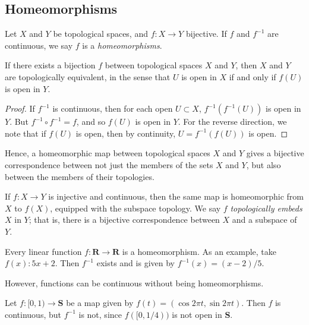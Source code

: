\subsection{Homeomorphisms}
\begin{definition}
\label{def:homeo}
Let \(X\) and \(Y\) be topological spaces, and  \(f: X \to Y\) bijective.
If \(f\) and \(f^{-1}\) are continuous, we say \(f\) is a
\emph{homeomorphisms}.
\end{definition}
\begin{theorem}
\label{thm:equiv-spaces}
If there exists a bijection \(f\) between topological spaces \(X\) and
\(Y\), then \(X\) and \(Y\) are topologically equivalent, in the sense that
\(U\) is open in \(X\) if and only if \(f(U)\) is open in \(Y\).
\end{theorem}
\begin{proof}
If \(f^{-1}\) is continuous, then for each open \(U \subset X\),
\(f^{-1}(f^{-1}(U))\) is open in \(Y\). But \(f^{-1} \circ f^{-1} = f\),
and so \(f(U)\) is open in \(Y\). For the reverse direction, we note that if
\(f(U)\) is open, then by continuity, \(U = f^{-1}(f(U)) \) is open.
\end{proof}
\begin{remark}
Hence, a homeomorphic map between topological spaces \(X\) and \(Y\) gives a
bijective correspondence between not just the members of the sets \(X\) and
\(Y\), but also between the members of their topologies.  \par If \(f: X \to
Y\) is injective and continuous, then the same map is homeomorphic from \(X\)
to \(f(X)\), equipped with the subspace topology. We say \(f\)
\emph{topologically embeds} \(X\) in \(Y\); that is, there is a bijective
correspondence between \(X\) and a subspace of \(Y\).
\end{remark}
\begin{example}
Every linear function \(f: \mathbf{R} \to \mathbf{R}\) is a homeomorphism. As
an example, take \(f(x): 5x + 2\). Then \(f^{-1}\) exists and is given by
\(f^{-1}(x) = (x-2)/5\).
\end{example}
However, functions can be continuous without being homeomorphisms.
\begin{example}
Let \(f: [0,1) \to \mathbf{S}\) be a map given by \(f(t) = (\cos 2\pi t, \sin 2 \pi
t)\). Then \(f\) is continuous, but \(f^{-1}\) is not, since
\(f([0, 1/4))\) is not open in \(\mathbf{S}\).
\end{example}
